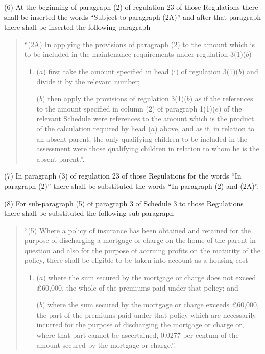 \documentclass[a4paper]{article}
\begin{document}
(6) At the beginning of paragraph (2) of regulation 23 of those Regulations there shall be inserted the words “Subject to paragraph (2A)” and after that paragraph there shall be inserted the following paragraph—
\begin{quotation}
“(2A) In applying the provisions of paragraph (2) to the amount which is to be included in the maintenance requirements under regulation 3(1)($b$)—
\begin{enumerate}\item[]
($a$) first take the amount specified in head (i) of regulation 3(1)($b$) and divide it by the relevant number;

($b$) then apply the provisions of regulation 3(1)($b$) as if the references to the amount specified in column (2) of paragraph 1(1)($e$) of the relevant Schedule were references to the amount which is the product of the calculation required by head ($a$) above, and as if, in relation to an absent parent, the only qualifying children to be included in the assessment were those qualifying children in relation to whom he is the absent parent.”.
\end{enumerate}
\end{quotation}

(7) In paragraph (3) of regulation 23 of those Regulations for the words “In paragraph (2)” there shall be substituted the words “In paragraph (2) and (2A)”.

(8) For sub-paragraph (5) of paragraph 3 of Schedule 3 to those Regulations there shall be substituted the following sub-paragraph—
\begin{quotation}
“(5) Where a policy of insurance has been obtained and retained for the purpose of discharging a mortgage or charge on the home of the parent in question and also for the purpose of accruing profits on the maturity of the policy, there shall be eligible to be taken into account as a housing cost—
\begin{enumerate}\item[]
($a$) where the sum secured by the mortgage or charge does not exceed £60,000, the whole of the premiums paid under that policy; and

($b$) where the sum secured by the mortgage or charge exceeds £60,000, the part of the premiums paid under that policy which are necessarily incurred for the purpose of discharging the mortgage or charge or, where that part cannot be ascertained, 0.0277 per centum of the amount secured by the mortgage or charge.”.
\end{enumerate}
\end{quotation}
\end{document}
